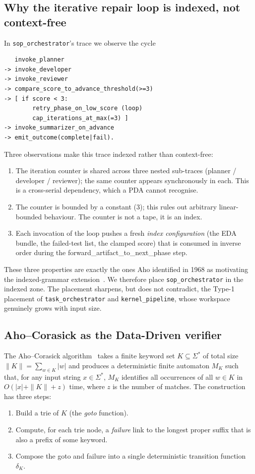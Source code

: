 \subsection{Why the iterative repair loop is indexed, not
context-free}

In \texttt{sop\_orchestrator}'s trace we observe the cycle
\begin{verbatim}
   invoke_planner
-> invoke_developer
-> invoke_reviewer
-> compare_score_to_advance_threshold(>=3)
-> [ if score < 3:
        retry_phase_on_low_score (loop)
        cap_iterations_at_max(=3) ]
-> invoke_summarizer_on_advance
-> emit_outcome(complete|fail).
\end{verbatim}
Three observations make this trace indexed rather than
context-free:
\begin{enumerate}
\item The iteration counter is shared across three nested
sub-traces (planner / developer / reviewer); the same counter
appears synchronously in each.  This is a cross-serial
dependency, which a PDA cannot recognise.
\item The counter is bounded by a constant (3); this rules out
arbitrary linear-bounded behaviour.  The counter is not a tape, it
is an index.
\item Each invocation of the loop pushes a fresh \emph{index
configuration} (the EDA bundle, the failed-test list, the
clamped score) that is consumed in inverse order during the
\textsf{forward\_artifact\_to\_next\_phase} step.
\end{enumerate}

These three properties are exactly the ones Aho identified in
1968 as motivating the indexed-grammar
extension~\cite{aho1968indexed}.  We therefore place
\texttt{sop\_orchestrator} in the indexed zone.  The placement
sharpens, but does not contradict, the Type-1 placement of
\texttt{task\_orchestrator} and \texttt{kernel\_pipeline}, whose
workspace genuinely grows with input size.

\subsection{Aho--Corasick as the Data-Driven verifier}

The Aho--Corasick algorithm~\cite{aho1975corasick} takes a
finite keyword set $K\subseteq \Sigma^*$ of total size $\|K\| =
\sum_{w\in K}|w|$ and produces a deterministic finite automaton
$M_K$ such that, for any input string $x\in\Sigma^*$, $M_K$
identifies all occurrences of all $w\in K$ in $O(|x| + \|K\| +
z)$ time, where $z$ is the number of matches.  The construction
has three steps:
\begin{enumerate}
\item Build a trie of $K$ (the \emph{goto} function).
\item Compute, for each trie node, a \emph{failure} link to the
longest proper suffix that is also a prefix of some keyword.
\item Compose the goto and failure into a single deterministic
transition function $\delta_K$.
\end{enumerate}

